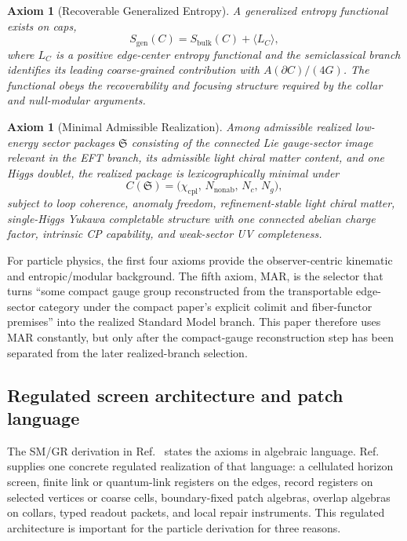 \documentclass[11pt]{article}
\newtheorem{axiom}[theorem]{Axiom}
\begin{document}
\begin{axiom}[Recoverable Generalized Entropy]\label{ax:entropy}
A generalized entropy functional exists on caps,
\[
S_{\mathrm{gen}}(C)=S_{\mathrm{bulk}}(C)+\langle L_C\rangle,
\]
where \(L_C\) is a positive edge-center entropy functional and the semiclassical branch
identifies its leading coarse-grained contribution with \(A(\partial C)/(4G)\). The functional
obeys the recoverability and focusing structure required by the collar and null-modular
arguments.
\end{axiom}

\begin{axiom}[Minimal Admissible Realization]\label{ax:mar}
Among admissible realized low-energy sector packages \(\mathfrak S\) consisting of the connected
Lie gauge-sector image relevant in the EFT branch, its admissible light chiral matter content,
and one Higgs doublet, the realized package is lexicographically minimal under
\[
C(\mathfrak S)=\bigl(\chi_{\mathrm{cpl}},\,N_{\mathrm{nonab}},\,N_c,\,N_g\bigr),
\]
subject to loop coherence, anomaly freedom, refinement-stable light chiral matter,
single-Higgs Yukawa completable structure with one connected abelian charge factor, intrinsic
CP capability, and weak-sector UV completeness.
\end{axiom}

For particle physics, the first four axioms provide the observer-centric kinematic and
entropic/modular background. The fifth axiom, MAR, is the selector that turns ``some compact
gauge group reconstructed from the transportable edge-sector category under the compact paper's
explicit colimit and fiber-functor premises'' into the realized Standard Model branch. This
paper therefore uses MAR constantly, but only after the compact-gauge reconstruction step has
been separated from the later realized-branch selection.

\subsection{Regulated screen architecture and patch language}

The SM/GR derivation in Ref.~\cite{ophcompact}
states the axioms in algebraic language. Ref.~\cite{ophmicrophysics} supplies one concrete regulated realization of that language: a cellulated horizon screen,
finite link or quantum-link registers on the edges, record registers on selected vertices or
coarse cells, boundary-fixed patch algebras, overlap algebras on collars, typed readout packets,
and local repair instruments. This regulated architecture is important for the particle derivation
for three reasons.
\end{document}
